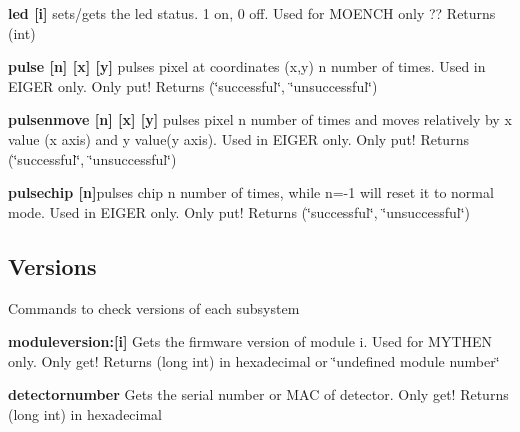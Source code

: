 \begin{DoxyItemize}
\item {\bfseries led \mbox{[}i\mbox{]}} sets/gets the led status. 1 on, 0 off. Used for MOENCH only ?? {\ttfamily Returns} {\ttfamily }(int)
\end{DoxyItemize}


\begin{DoxyItemize}
\item {\bfseries pulse \mbox{[}n\mbox{]} \mbox{[}x\mbox{]} \mbox{[}y\mbox{]}} pulses pixel at coordinates (x,y) n number of times. Used in EIGER only. Only put! {\ttfamily Returns} {\ttfamily }(\char`\"{}successful\char`\"{}, \char`\"{}unsuccessful\char`\"{})
\end{DoxyItemize}


\begin{DoxyItemize}
\item {\bfseries pulsenmove \mbox{[}n\mbox{]} \mbox{[}x\mbox{]} \mbox{[}y\mbox{]}} pulses pixel n number of times and moves relatively by x value (x axis) and y value(y axis). Used in EIGER only. Only put! {\ttfamily Returns} {\ttfamily }(\char`\"{}successful\char`\"{}, \char`\"{}unsuccessful\char`\"{})
\end{DoxyItemize}


\begin{DoxyItemize}
\item {\bfseries pulsechip \mbox{[}n\mbox{]}}pulses chip n number of times, while n=-\/1 will reset it to normal mode. Used in EIGER only. Only put! {\ttfamily Returns} {\ttfamily }(\char`\"{}successful\char`\"{}, \char`\"{}unsuccessful\char`\"{})
\end{DoxyItemize}\hypertarget{config_configversions}{}\subsection{Versions}\label{config_configversions}
Commands to check versions of each subsystem


\begin{DoxyItemize}
\item {\bfseries moduleversion:\mbox{[}i\mbox{]}} Gets the firmware version of module i. Used for MYTHEN only. Only get! {\ttfamily Returns} {\ttfamily }(long int) in hexadecimal or \char`\"{}undefined module number\char`\"{}
\end{DoxyItemize}


\begin{DoxyItemize}
\item {\bfseries detectornumber} Gets the serial number or MAC of detector. Only get! {\ttfamily Returns} {\ttfamily }(long int) in hexadecimal
\end{DoxyItemize}


